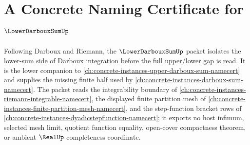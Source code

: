 \chapter{A Concrete Naming Certificate for $\LowerDarbouxSumUp$}
\label{ch:concrete-instances-lower-darboux-sum-namecert}

Following Darboux and Riemann, the $\LowerDarbouxSumUp$ packet isolates the lower-sum side of Darboux integration before the full upper/lower gap is read. It is the lower companion to \autoref{ch:concrete-instances-upper-darboux-sum-namecert} and supplies the missing finite half used by \autoref{ch:concrete-instances-darboux-sum-namecert}. The packet reads the integrability boundary of \autoref{ch:concrete-instances-riemann-integrable-namecert}, the displayed finite partition mesh of \autoref{ch:concrete-instances-finite-partition-mesh-namecert}, and the step-function bracket rows of \autoref{ch:concrete-instances-dyadicstepfunction-namecert}; it exports no host infimum, selected mesh limit, quotient function equality, open-cover compactness theorem, or ambient $\RealUp$ completeness coordinate.

